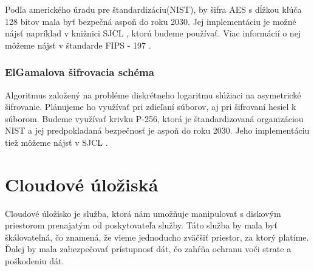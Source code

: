 		Podľa amerického úradu pre štandardizáciu(NIST), by šifra AES s dĺžkou kľúča 128 bitov mala byť bezpečná aspoň do roku 2030. Jej implementáciu je možné nájsť napríklad v knižnici SJCL \cite{SJCLgit}, ktorú budeme používať. Viac informácií o nej môžeme nájsť v štandarde FIPS - 197 \cite{FIPS197}.
	\subsubsection{ElGamalova šifrovacia  schéma}
		Algoritmus založený na probléme diskrétneho logaritmu slúžiaci na asymetrické šifrovanie. Plánujeme ho využívať pri zdieľaní súborov, aj pri šifrovaní hesiel k súborom. Budeme využívať krivku P-256, ktorá je štandardizovaná organizáciou NIST a jej predpokladaná bezpečnosť je aspoň do roku 2030. Jeho implementáciu tiež môžeme nájsť v SJCL \cite{SJCLgit}.
		
\section{Cloudové úložiská}
	Cloudové úložisko je služba, ktorá nám umožňuje manipulovať s diskovým priestorom prenajatým od poskytovateľa služby. Táto služba by mala byť škálovateľná, čo znamená, že vieme jednoducho zväčšiť priestor, za ktorý platíme. Ďalej by mala zabezpečovať prístupnosť dát, čo zahŕňa ochranu voči strate a poškodeniu dát.
	
	